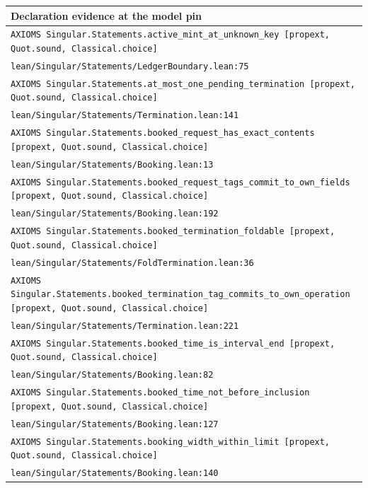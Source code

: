 \begin{longtable}{p{.94\linewidth}}
\toprule Declaration evidence at the model pin\\\midrule\endhead
\texttt{AXIOMS }\nolinkurl{Singular.Statements.active_mint_at_unknown_key}\texttt{ [propext, Quot.sound, Classical.choice]}\\
\nolinkurl{lean/Singular/Statements/LedgerBoundary.lean:75}\\[5pt]
\texttt{AXIOMS }\nolinkurl{Singular.Statements.at_most_one_pending_termination}\texttt{ [propext, Quot.sound, Classical.choice]}\\
\nolinkurl{lean/Singular/Statements/Termination.lean:141}\\[5pt]
\texttt{AXIOMS }\nolinkurl{Singular.Statements.booked_request_has_exact_contents}\texttt{ [propext, Quot.sound, Classical.choice]}\\
\nolinkurl{lean/Singular/Statements/Booking.lean:13}\\[5pt]
\texttt{AXIOMS }\nolinkurl{Singular.Statements.booked_request_tags_commit_to_own_fields}\texttt{ [propext, Quot.sound, Classical.choice]}\\
\nolinkurl{lean/Singular/Statements/Booking.lean:192}\\[5pt]
\texttt{AXIOMS }\nolinkurl{Singular.Statements.booked_termination_foldable}\texttt{ [propext, Quot.sound, Classical.choice]}\\
\nolinkurl{lean/Singular/Statements/FoldTermination.lean:36}\\[5pt]
\texttt{AXIOMS }\nolinkurl{Singular.Statements.booked_termination_tag_commits_to_own_operation}\texttt{ [propext, Quot.sound, Classical.choice]}\\
\nolinkurl{lean/Singular/Statements/Termination.lean:221}\\[5pt]
\texttt{AXIOMS }\nolinkurl{Singular.Statements.booked_time_is_interval_end}\texttt{ [propext, Quot.sound, Classical.choice]}\\
\nolinkurl{lean/Singular/Statements/Booking.lean:82}\\[5pt]
\texttt{AXIOMS }\nolinkurl{Singular.Statements.booked_time_not_before_inclusion}\texttt{ [propext, Quot.sound, Classical.choice]}\\
\nolinkurl{lean/Singular/Statements/Booking.lean:127}\\[5pt]
\texttt{AXIOMS }\nolinkurl{Singular.Statements.booking_width_within_limit}\texttt{ [propext, Quot.sound, Classical.choice]}\\
\nolinkurl{lean/Singular/Statements/Booking.lean:140}\\[5pt]

\end{longtable}
